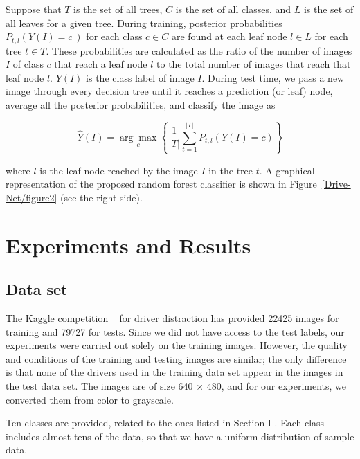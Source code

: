 Suppose that $T $ is the set of all trees, $C $ is the set of all classes, and $L $ is the set of all leaves for a given tree. During training, posterior probabilities $P_{t,l}\left(Y\left(I\right)=c\:\right) $ for each class $c\in C $ are found at each leaf node $l\in L $ for each tree $t\in T $. These probabilities are calculated as the ratio of the number of images $I $ of class $c $ that reach a leaf node $l $ to the total number of images that reach that leaf node $l $. $Y\left(I\right) $ is the class label of image $I $. During test time, we pass a new image through every decision tree until it reaches a prediction (or leaf) node, average all the posterior probabilities, and classify the image as


\begin{equation}
\label{disp-formula-group-032e1395024b44bca0feeb46474c0adc}
\widehat Y(I) = \underset c {\arg \max} \left\{\frac{1}{\left\vert T\right\vert}\sum_{t=1}^{\left\vert T\right\vert} P_{t,l} (Y(I) = c) \right\}
\end{equation}


where $l $ is the leaf node reached by the image $I $ in the tree $t $. A graphical representation of the proposed random forest classifier is shown in Figure~\ref{Drive-Net/figure2}  (see the right side).

\section{Experiments and Results}


\subsection{Data set} The Kaggle competition \unskip~\cite{1641075:26775858} for driver distraction has provided 22425 images for training and 79727 for tests. Since we did not have access to the test labels, our experiments were carried out solely on the training images. However, the quality and conditions of the training and testing images are similar; the only difference is that none of the drivers used in the training data set appear in the images in the test data set. The images are of size 640 \ensuremath{\times} 480, and for our experiments, we converted them from color to grayscale.

Ten classes are provided, related to the ones listed in Section I \@. Each class includes almost tens of the data, so that we have a uniform distribution of sample data.

